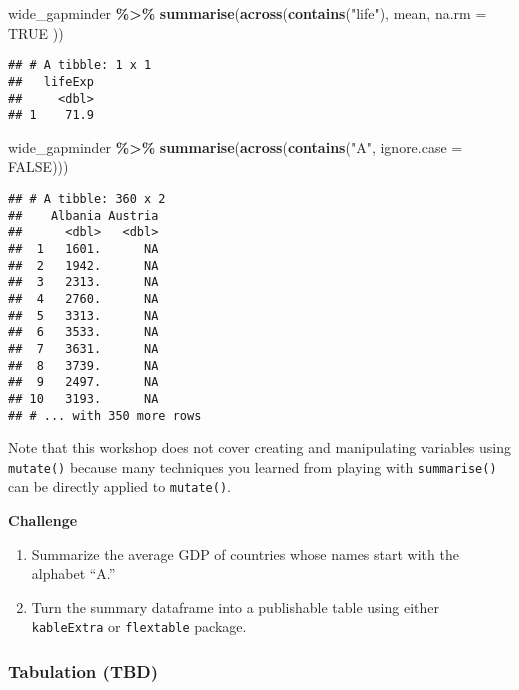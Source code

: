 \documentclass[
]{book}
\newenvironment{Shaded}{\begin{snugshade}}{\end{snugshade}}
\newcommand{\DataTypeTok}[1]{\textcolor[rgb]{0.13,0.29,0.53}{#1}}
\newcommand{\KeywordTok}[1]{\textcolor[rgb]{0.13,0.29,0.53}{\textbf{#1}}}
\newcommand{\NormalTok}[1]{#1}
\newcommand{\OperatorTok}[1]{\textcolor[rgb]{0.81,0.36,0.00}{\textbf{#1}}}
\newcommand{\OtherTok}[1]{\textcolor[rgb]{0.56,0.35,0.01}{#1}}
\newcommand{\StringTok}[1]{\textcolor[rgb]{0.31,0.60,0.02}{#1}}
\begin{document}
\begin{Shaded}
\begin{Highlighting}[]
\NormalTok{wide\_gapminder }\OperatorTok{\%\textgreater{}\%}
\StringTok{  }\KeywordTok{summarise}\NormalTok{(}\KeywordTok{across}\NormalTok{(}\KeywordTok{contains}\NormalTok{(}\StringTok{"life"}\NormalTok{),}
\NormalTok{    mean,}
    \DataTypeTok{na.rm =} \OtherTok{TRUE}
\NormalTok{  ))}
\end{Highlighting}
\end{Shaded}

\begin{verbatim}
## # A tibble: 1 x 1
##   lifeExp
##     <dbl>
## 1    71.9
\end{verbatim}

\begin{Shaded}
\begin{Highlighting}[]
\NormalTok{wide\_gapminder }\OperatorTok{\%\textgreater{}\%}
\StringTok{  }\KeywordTok{summarise}\NormalTok{(}\KeywordTok{across}\NormalTok{(}\KeywordTok{contains}\NormalTok{(}\StringTok{"A"}\NormalTok{, }\DataTypeTok{ignore.case =} \OtherTok{FALSE}\NormalTok{)))}
\end{Highlighting}
\end{Shaded}

\begin{verbatim}
## # A tibble: 360 x 2
##    Albania Austria
##      <dbl>   <dbl>
##  1   1601.      NA
##  2   1942.      NA
##  3   2313.      NA
##  4   2760.      NA
##  5   3313.      NA
##  6   3533.      NA
##  7   3631.      NA
##  8   3739.      NA
##  9   2497.      NA
## 10   3193.      NA
## # ... with 350 more rows
\end{verbatim}

Note that this workshop does not cover creating and manipulating variables using \texttt{mutate()} because many techniques you learned from playing with \texttt{summarise()} can be directly applied to \texttt{mutate()}.

\textbf{Challenge}

\begin{enumerate}
\def\labelenumi{\arabic{enumi}.}
\item
  Summarize the average GDP of countries whose names start with the alphabet ``A.''
\item
  Turn the summary dataframe into a publishable table using either \texttt{kableExtra} or \texttt{flextable} package.
\end{enumerate}

\hypertarget{tabulation-tbd}{%
\subsubsection{Tabulation (TBD)}\label{tabulation-tbd}}
\end{document}
